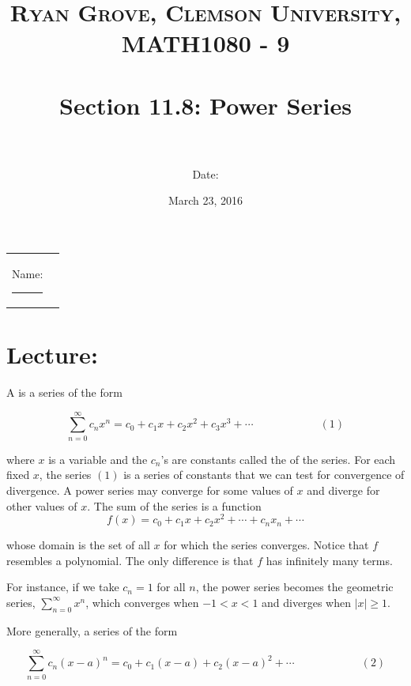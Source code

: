 \documentclass[paper=a4, fontsize=11pt]{scrartcl} %
\title{	
\normalfont \normalsize 
\textsc{Ryan Grove, Clemson University, MATH1080 - 9} \\ [25pt] %
\horrule{0.5pt} \\[0.4cm] %
\huge Section 11.8: Power Series\\ %
\horrule{2pt} \\[0.5cm] %
}
\author{Date:} %
\date{\normalsize March 23, 2016} %
\numberwithin{equation}{section} %
\numberwithin{figure}{section} %
\numberwithin{table}{section} %
\newcommand{\ds}{\displaystyle}
\begin{document}
\maketitle %

\begin{flushleft}
\begin{tabular}{l l}
Name: \rule{3.2in}{.01cm}  & {}%
\end{tabular}
\end{flushleft}


\section*{\textbf{Lecture:}}
A \underline{\hspace{1in}} \underline{\hspace{1in}} is a series of the form

\[\ds\sum_{n=0}^\infty c_n x^n = c_0 + c_1 x + c_2 x^2 + c_3 x^3 + \cdots \hspace{1in} (1)\]

where $x$ is a variable and the $c_n$'s are constants called the \underline{\hspace{1.25in}} of the series. For each fixed $x$, the series $(1)$ is a series of constants that we can test for convergence of divergence. A power series may converge for some values of $x$ and diverge for other values of $x$. The sum of the series is a function
\[f(x) = c_0 + c_1 x + c_2 x^2 + \cdots + c_nx_n + \cdots\]

whose domain is the set of all $x$ for which the series converges. Notice that $f$ resembles a polynomial. The only difference is that $f$ has infinitely many terms.\\
\indent

For instance, if we take $c_n=1$ for all $n$, the power series becomes the geometric series, $\ds\sum_{n=0}^\infty x^n$, which converges when $-1 < x < 1$ and diverges when $|x|\geq 1$.\\
\indent

More generally, a series of the form

\[\ds\sum_{n=0}^\infty c_n (x-a)^n = c_0 + c_1 (x-a) + c_2 (x-a)^2 + \cdots \hspace{1in} (2)\]
\end{document}
